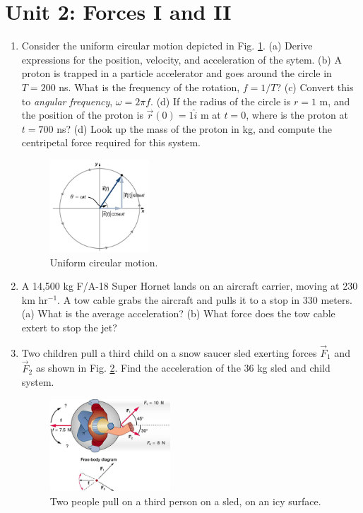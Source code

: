 \documentclass[10pt]{article}
\begin{document}
\section{Unit 2: Forces I and II}

\begin{enumerate}
\item Consider the uniform circular motion depicted in Fig. \ref{fig:2}. (a) Derive expressions for the position, velocity, and acceleration of the sytem. (b) A proton is trapped in a particle accelerator and goes around the circle in $T = 200$ ns.  What is the frequency of the rotation, $f = 1/T$? (c) Convert this to \textit{angular frequency}, $\omega = 2\pi f$. (d) If the radius of the circle is $r=1$ m, and the position of the proton is $\vec{r}(0) = 1\hat{i}$ m at $t=0$, where is the proton at $t=700$ ns? (d) Look up the mass of the proton in kg, and compute the centripetal force required for this system.
\begin{figure}
\centering
\includegraphics[width=0.35\textwidth]{circ_motion.png}
\caption{\label{fig:2} Uniform circular motion.}
\end{figure} \vspace{3.5cm}
\item A 14,500 kg F/A-18 Super Hornet lands on an aircraft carrier, moving at 230 km hr$^{-1}$. A tow cable grabs the aircraft and pulls it to a stop in 330 meters. (a) What is the average acceleration? (b) What force does the tow cable extert to stop the jet? \\ \vspace{2.5cm}
\item Two children pull a third child on a snow saucer sled exerting forces $\vec{F}_1$ and $\vec{F}_2$ as shown in Fig. \ref{fig:3}. Find the acceleration of the 36 kg sled and child system.
\begin{figure}
\centering
\includegraphics[width=0.425\textwidth]{sled.jpeg}
\caption{\label{fig:3} Two people pull on a third person on a sled, on an icy surface.}
\end{figure}\vspace{2cm}
\end{enumerate}
\end{document}

